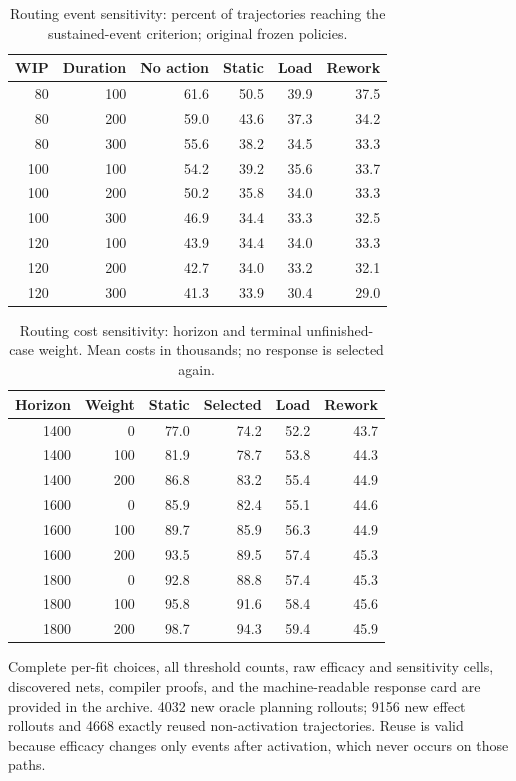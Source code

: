 \begin{table}[p]\caption{Routing event sensitivity: percent of trajectories reaching the sustained-event criterion; original frozen policies.}\centering\small\setlength{\tabcolsep}{3pt}\begin{tabular}{rrrrrr}\toprule
WIP & Duration & No action & Static & Load & Rework\\\midrule
80 & 100 & 61.6 & 50.5 & 39.9 & 37.5\\
80 & 200 & 59.0 & 43.6 & 37.3 & 34.2\\
80 & 300 & 55.6 & 38.2 & 34.5 & 33.3\\
100 & 100 & 54.2 & 39.2 & 35.6 & 33.7\\
100 & 200 & 50.2 & 35.8 & 34.0 & 33.3\\
100 & 300 & 46.9 & 34.4 & 33.3 & 32.5\\
120 & 100 & 43.9 & 34.4 & 34.0 & 33.3\\
120 & 200 & 42.7 & 34.0 & 33.2 & 32.1\\
120 & 300 & 41.3 & 33.9 & 30.4 & 29.0\\
\bottomrule\end{tabular}\end{table}
\begin{table}[p]\caption{Routing cost sensitivity: horizon and terminal unfinished-case weight. Mean costs in thousands; no response is selected again.}\centering\small\setlength{\tabcolsep}{3pt}\begin{tabular}{rrrrrr}\toprule
Horizon & Weight & Static & Selected & Load & Rework\\\midrule
1400 & 0 & 77.0 & 74.2 & 52.2 & 43.7\\
1400 & 100 & 81.9 & 78.7 & 53.8 & 44.3\\
1400 & 200 & 86.8 & 83.2 & 55.4 & 44.9\\
1600 & 0 & 85.9 & 82.4 & 55.1 & 44.6\\
1600 & 100 & 89.7 & 85.9 & 56.3 & 44.9\\
1600 & 200 & 93.5 & 89.5 & 57.4 & 45.3\\
1800 & 0 & 92.8 & 88.8 & 57.4 & 45.3\\
1800 & 100 & 95.8 & 91.6 & 58.4 & 45.6\\
1800 & 200 & 98.7 & 94.3 & 59.4 & 45.9\\
\bottomrule\end{tabular}\end{table}
Complete per-fit choices, all threshold counts, raw efficacy and sensitivity cells, discovered nets, compiler proofs, and the machine-readable response card are provided in the archive. 4032 new oracle planning rollouts; 9156 new effect rollouts and 4668 exactly reused non-activation trajectories. Reuse is valid because efficacy changes only events after activation, which never occurs on those paths.
